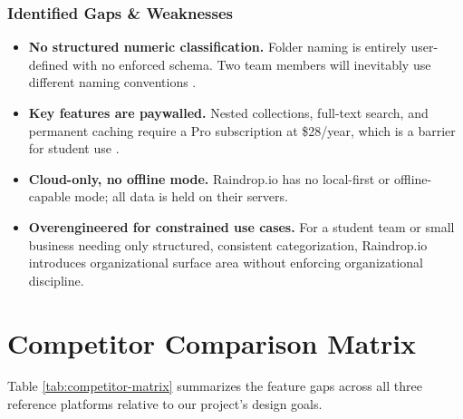 \documentclass[11pt,a4paper]{book}
\begin{document}
\subsubsection{Identified Gaps \& Weaknesses}
 
\begin{itemize}
    \item \textbf{No structured numeric classification.} Folder naming is entirely user-defined with no enforced schema. Two team members will inevitably use different naming conventions \citep{jones2007keeping}.
    \item \textbf{Key features are paywalled.} Nested collections, full-text search, and permanent caching require a Pro subscription at \$28/year, which is a barrier for student use \citep{raindropio2024}.
    \item \textbf{Cloud-only, no offline mode.} Raindrop.io has no local-first or offline-capable mode; all data is held on their servers.
    \item \textbf{Overengineered for constrained use cases.} For a student team or small business needing only structured, consistent categorization, Raindrop.io introduces organizational surface area without enforcing organizational discipline.
\end{itemize}
 
\section{Competitor Comparison Matrix}
 
Table \ref{tab:competitor-matrix} summarizes the feature gaps across all three reference platforms relative to our project's design goals.
 
\end{document}
